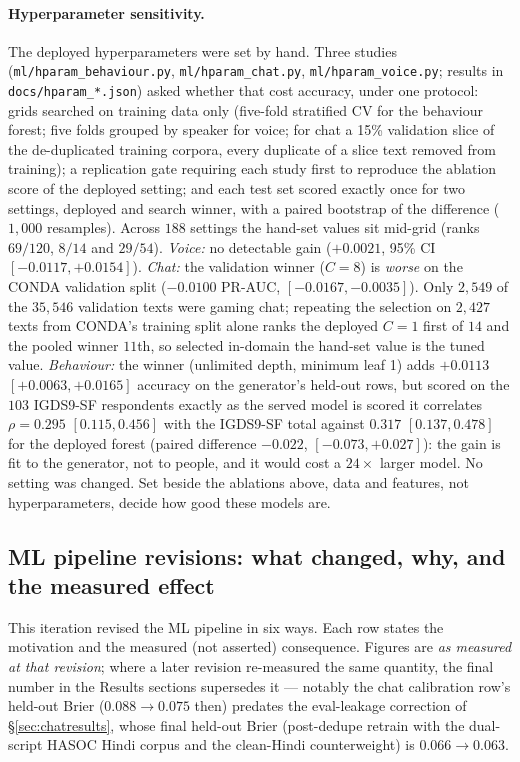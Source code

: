 \documentclass[11pt,a4paper]{article}
\begin{document}
\paragraph{Hyperparameter sensitivity.}\label{sec:hparam}
The deployed hyperparameters were set by hand. Three studies
(\texttt{ml/hparam\_behaviour.py}, \texttt{ml/hparam\_chat.py},
\texttt{ml/hparam\_voice.py}; results in \texttt{docs/hparam\_*.json}) asked whether
that cost accuracy, under one protocol: grids searched on training data only
(five-fold stratified CV for the behaviour forest; five folds grouped by speaker for
voice; for chat a 15\% validation slice of the de-duplicated training corpora, every
duplicate of a slice text removed from training); a replication gate requiring each
study first to reproduce the ablation score of the deployed setting; and each test set
scored exactly once for two settings, deployed and search winner, with a paired
bootstrap of the difference ($1{,}000$ resamples). Across $188$ settings the hand-set
values sit mid-grid (ranks $69/120$, $8/14$ and $29/54$). \emph{Voice:} no detectable
gain ($+0.0021$, 95\% CI $[-0.0117, +0.0154]$). \emph{Chat:} the validation winner
($C = 8$) is \emph{worse} on the CONDA validation split ($-0.0100$ PR-AUC,
$[-0.0167, -0.0035]$). Only $2{,}549$ of the $35{,}546$ validation texts were gaming
chat; repeating the selection on $2{,}427$ texts from CONDA's training split alone ranks
the deployed $C = 1$ first of $14$ and the pooled winner $11$th, so selected in-domain
the hand-set value is the tuned value. \emph{Behaviour:} the winner (unlimited depth,
minimum leaf 1) adds $+0.0113$ $[+0.0063, +0.0165]$ accuracy on the generator's
held-out rows, but scored on the $103$ IGDS9-SF respondents exactly as the served model
is scored it correlates $\rho = 0.295$ $[0.115, 0.456]$ with the IGDS9-SF total against
$0.317$ $[0.137, 0.478]$ for the deployed forest (paired difference $-0.022$,
$[-0.073, +0.027]$): the gain is fit to the generator, not to people, and it would cost
a $24\times$ larger model. No setting was changed. Set beside the ablations above, data
and features, not hyperparameters, decide how good these models are.

\subsection{ML pipeline revisions: what changed, why, and the measured effect}
\label{sec:mlrevisions}
This iteration revised the ML pipeline in six ways. Each row states the motivation
and the measured (not asserted) consequence. Figures are \emph{as measured at that
revision}; where a later revision re-measured the same quantity, the final number in
the Results sections supersedes it --- notably the chat calibration row's held-out
Brier ($0.088 \rightarrow 0.075$ then) predates the eval-leakage correction of
\S\ref{sec:chatresults}, whose final held-out Brier (post-dedupe retrain with the
dual-script HASOC Hindi corpus and the clean-Hindi counterweight) is
$0.066 \rightarrow 0.063$.
\end{document}
